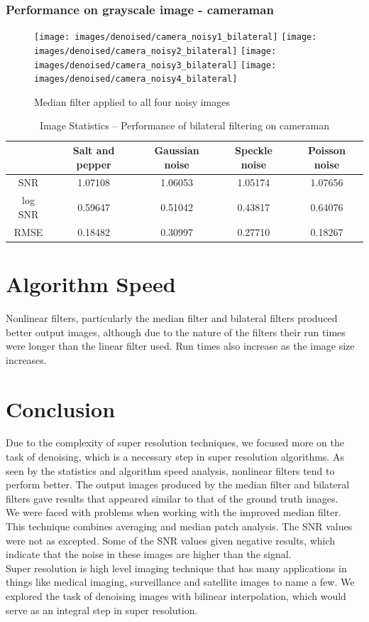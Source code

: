 \documentclass{article}
\begin{document}
\subsubsection{Performance on grayscale image - cameraman}
\begin{figure}[H]
  \centering
  \texttt{[image: images/denoised/camera\_noisy1\_bilateral]}
  \texttt{[image: images/denoised/camera\_noisy2\_bilateral]}
  \texttt{[image: images/denoised/camera\_noisy3\_bilateral]}
  \texttt{[image: images/denoised/camera\_noisy4\_bilateral]}
  \caption{Median filter applied to all four noisy images }
\end{figure}
%
\begin{table}[H]
  \centering
  \begin{tabular}{c | c | c | c | c}
    & Salt and pepper & Gaussian noise & Speckle noise & Poisson noise \\
    \hline
    SNR & 1.07108 & 1.06053 & 1.05174 & 1.07656 \\
    log SNR & 0.59647 & 0.51042 & 0.43817 & 0.64076 \\
    RMSE & 0.18482 & 0.30997 & 0.27710 & 0.18267 \\
  \end{tabular}
  \caption{Image Statistics -- Performance of bilateral filtering on cameraman}
  \label{table:}
\end{table}
\section{Algorithm Speed}
Nonlinear filters, particularly the median filter and bilateral
filters produced better output images, although due to the nature of
the filters their run times were longer than the linear filter
used. Run times also increase as the image size increases. 
\section{Conclusion}
Due to the complexity of super resolution techniques, we focused more
on the task of denoising, which is a necessary step in super resolution
algorithms. As seen by the statistics and algorithm speed analysis,
nonlinear filters tend to perform better. The output images produced
by the median filter and bilateral filters gave results that appeared
similar to that of the ground truth images. \\

We were faced with problems when working with the improved median
filter. This technique combines averaging and median patch
analysis. The SNR values were not as excepted. Some of the SNR values
given negative results, which indicate that the noise in these images
are higher than the signal. \\

Super resolution is high level imaging technique that has many
applications in things like medical imaging, surveillance and
satellite images to name a few. We explored the task of denoising
images with bilinear interpolation, which would serve as an integral
step in super resolution. 

\newpage
\printbibliography
\end{document}
